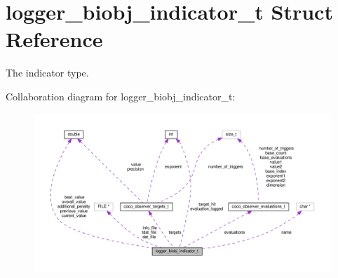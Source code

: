 \hypertarget{structlogger__biobj__indicator__t}{}\section{logger\+\_\+biobj\+\_\+indicator\+\_\+t Struct Reference}
\label{structlogger__biobj__indicator__t}


The indicator type.  




Collaboration diagram for logger\+\_\+biobj\+\_\+indicator\+\_\+t\+:\nopagebreak
\begin{figure}[H]
\begin{center}
\leavevmode
\includegraphics[width=350pt]{structlogger__biobj__indicator__t__coll__graph}
\end{center}
\end{figure}
